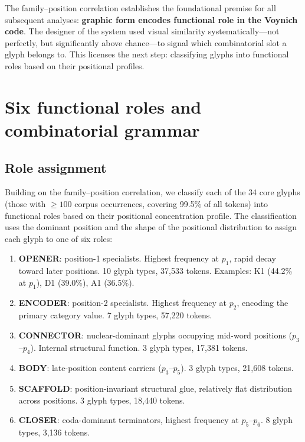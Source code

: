 The family--position correlation establishes the foundational premise
for all subsequent analyses: \textbf{graphic form encodes functional
role in the Voynich code}. The designer of the system used visual
similarity systematically---not perfectly, but significantly above
chance---to signal which combinatorial slot a glyph belongs to. This
licenses the next step: classifying glyphs into functional roles based
on their positional profiles.


\section{Six functional roles and combinatorial grammar}
\label{sec:role_grammar}

\subsection{Role assignment}

Building on the family--position correlation, we classify each of the
34 core glyphs (those with $\geq 100$ corpus occurrences, covering
99.5\% of all tokens) into functional roles based on their positional
concentration profile. The classification uses the dominant position
and the shape of the positional distribution to assign each glyph to
one of six roles:

\begin{enumerate}[nosep]
  \item \textbf{OPENER}: position-1 specialists. Highest frequency at
    $p_1$, rapid decay toward later positions. 10 glyph types, 37,533
    tokens. Examples: K1 (44.2\% at $p_1$), D1 (39.0\%), A1 (36.5\%).
  \item \textbf{ENCODER}: position-2 specialists. Highest frequency at
    $p_2$, encoding the primary category value. 7 glyph types, 57,220
    tokens.
  \item \textbf{CONNECTOR}: nuclear-dominant glyphs occupying
    mid-word positions ($p_3$--$p_4$). Internal structural function.
    3 glyph types, 17,381 tokens.
  \item \textbf{BODY}: late-position content carriers ($p_3$--$p_5$).
    3 glyph types, 21,608 tokens.
  \item \textbf{SCAFFOLD}: position-invariant structural glue,
    relatively flat distribution across positions. 3 glyph types,
    18,440 tokens.
  \item \textbf{CLOSER}: coda-dominant terminators, highest frequency
    at $p_5$--$p_6$. 8 glyph types, 3,136 tokens.
\end{enumerate}

